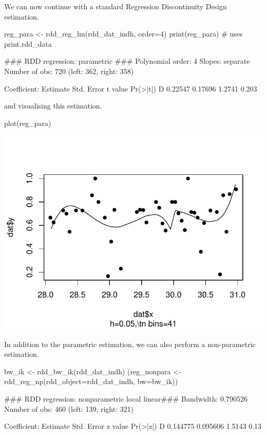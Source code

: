 \documentclass[article]{jss}
\begin{document}
We can now continue with a standard Regression Discontinuity Design
estimation.

\begin{CodeChunk}
\begin{CodeInput}
reg_para <- rdd_reg_lm(rdd_dat_indh, order=4)
print(reg_para) # uses print.rdd_data
\end{CodeInput}
\begin{CodeOutput}
### RDD regression: parametric ###
    Polynomial order:  4 
    Slopes:  separate 
    Number of obs: 720 (left: 362, right: 358)

    Coefficient:
  Estimate Std. Error t value Pr(>|t|)
D  0.22547    0.17696  1.2741    0.203
\end{CodeOutput}
\end{CodeChunk}

and visualising this estimation.

\begin{CodeChunk}
\begin{CodeInput}
plot(reg_para)
\end{CodeInput}


\begin{center}\includegraphics{README_files/figure-latex/unnamed-chunk-8-1} \end{center}

\end{CodeChunk}

In addition to the parametric estimation, we can also perform a
non-parametric estimation.

\begin{CodeChunk}
\begin{CodeInput}
bw_ik <- rdd_bw_ik(rdd_dat_indh)
(reg_nonpara <- rdd_reg_np(rdd_object=rdd_dat_indh, bw=bw_ik))
\end{CodeInput}
\begin{CodeOutput}
### RDD regression: nonparametric local linear###
    Bandwidth:  0.790526 
    Number of obs: 460 (left: 139, right: 321)

    Coefficient:
  Estimate Std. Error z value Pr(>|z|)
D 0.144775   0.095606  1.5143     0.13
\end{CodeOutput}
\end{CodeChunk}
\end{document}
